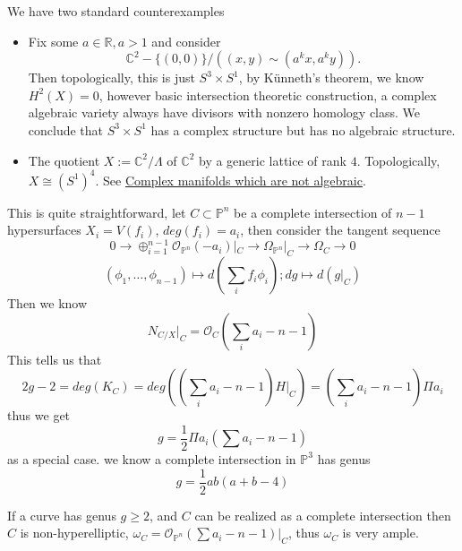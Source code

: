 \documentclass[../main.tex]{subfiles}
\begin{document}
\begin{example}
We have two standard counterexamples
\begin{itemize}
\item Fix some $a\in \mathbb{R}, a>1$ and consider 
$$\mathbb{C}^{2}-\{(0,0)\}/((x,y)\sim (a^{k}x,a^{k}y)).$$
Then topologically, this is just $S^{3}\times S^{1}$, by  Künneth’s theorem, we know $H^{2}(X)=0$, however basic intersection theoretic construction, a complex algebraic variety always have divisors with nonzero homology class. We conclude that $S^{3}\times S^{1}$ has a complex structure but has no algebraic structure.
\item The quotient $X:=\mathbb{C}^{2}/\Lambda$ of $\mathbb{C}^{2}$ by a generic lattice of rank $4$. Topologically, $X\cong (S^{1})^{4}.$ See \href{https://sbseminar.wordpress.com/2008/02/14/complex-manifolds-which-are-not-algebraic/}{Complex manifolds which are not algebraic}.
\end{itemize}
\end{example}

\begin{example}
This is quite straightforward, let $C \subset \mathbb{P}^{n}$ be a complete intersection of $n-1$ hypersurfaces $X_{i}=V(f_{i})$, $deg(f_{i})=a_{i}$, then consider the tangent sequence 
$$0\rightarrow \oplus_{i=1}^{n-1}\mathcal{O}_{\mathbb{P}^{n}}(-a_{i})|_{C}\rightarrow \Omega_{\mathbb{P}^{n}}|_{C}\rightarrow \Omega_{C}\rightarrow 0$$
$$(\phi_{1},\dots, \phi_{n-1})\mapsto d(\sum_{i}f_{i}\phi_{i}); dg\mapsto d(g|_{C})$$
Then we know 
$$N_{C/X}|_{C}=\mathcal{O}_{C}(\sum_{i}a_{i}-n-1)$$
This tells us that 
$$2g-2=deg(K_{C})=deg((\sum_{i}a_{i}-n-1)H|_{C})=(\sum_{i}a_{i}-n-1)\Pi a_{i}$$
thus we get 
$$g=\frac{1}{2}\Pi a_{i}(\sum a_{i}-n-1)$$
as a special case. we know a complete intersection in $\mathbb{P}^{3}$ has genus 
$$g=\frac{1}{2}ab(a+b-4)$$
\end{example}
\begin{remark}
If a curve has genus $g\geq 2$, and $C$ can be realized as a complete intersection then $C$ is non-hyperelliptic, $\omega_{C}=\mathcal{O}_{\mathbb{P}^{n}}(\sum a_{i}-n-1)|_{C}$, thus $\omega_{C}$ is very ample. 
\end{remark}
\end{document}
